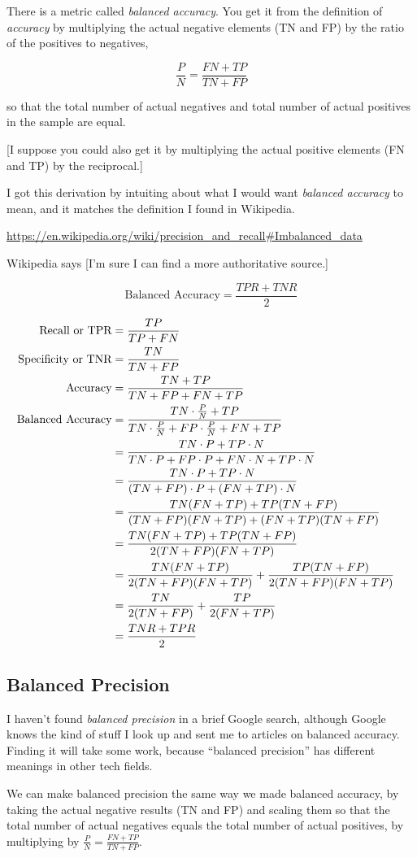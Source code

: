 \documentclass[11pt]{article}
\begin{document}
\begin{spacing}{1.2}
There is a metric called {\it balanced accuracy}.  You get it from the definition of {\it accuracy} by multiplying the actual negative elements (TN and FP) by the ratio of the positives to negatives, 

$$\frac{P}{N} = \frac{FN+TP}{TN+FP}$$

so that the total number of actual negatives and total number of actual positives in the sample are equal.

[I suppose you could also get it by multiplying the actual positive elements (FN and TP) by the reciprocal.]

I got this derivation by intuiting about what I would want {\it balanced accuracy} to mean, and it matches the definition I found in Wikipedia.  

\url{https://en.wikipedia.org/wiki/precision_and_recall#Imbalanced_data}

Wikipedia says [I'm sure I can find a more authoritative source.]

$$\text{Balanced Accuracy} = \frac{TPR + TNR}{2}$$

\begin{align*}
	\text{Recall or TPR} &= \frac{TP}{TP+FN} \cr
	\text{Specificity or TNR} &= \frac{TN}{TN+FP} \cr
	\text{Accuracy} &= \frac{TN+TP}{TN+FP+FN+TP} \cr
	\text{Balanced Accuracy} &=  \frac{TN \cdot \frac{P}{N}+TP}{TN \cdot \frac{P}{N}+FP \cdot \frac{P}{N}+FN+TP} \cr
		&= \frac{TN \cdot P+TP \cdot N}{TN \cdot P+FP \cdot P+FN \cdot N+TP\cdot N} \cr
	&= \frac{TN \cdot P+TP \cdot N}{(TN+FP) \cdot P+(FN+TP) \cdot  N} \cr
	&= \frac{TN (FN+TP)+TP (TN+FP)}{(TN+FP) (FN+TP)+(FN+TP) (TN+FP)} \cr
	&= \frac{TN (FN+TP)+TP (TN+FP)}{2(TN+FP) (FN+TP)} \cr
	&= \frac{TN (FN+TP)}{2(TN+FP) (FN+TP)}  + \frac{TP (TN+FP)}{2(TN+FP) (FN+TP)} \cr
	&= \frac{TN}{2(TN+FP) }  + \frac{TP }{2 (FN+TP)} \cr
	&= \frac{TNR+TPR}{2} \cr
\end{align*}

\subsection{Balanced Precision}

I haven't found {\it balanced precision} in a brief Google search, although Google knows the kind of stuff I look up and sent me to articles on balanced accuracy.  Finding it will take some work, because ``balanced precision'' has different meanings in other tech fields.  

We can make balanced precision the same way we made balanced accuracy, by taking the actual negative results (TN and FP) and scaling them  so that the total number of actual negatives equals the total number of actual positives, by multiplying by $\frac{P}{N} = \frac{FN+TP}{TN+FP}$.


\end{spacing}
\end{document}
